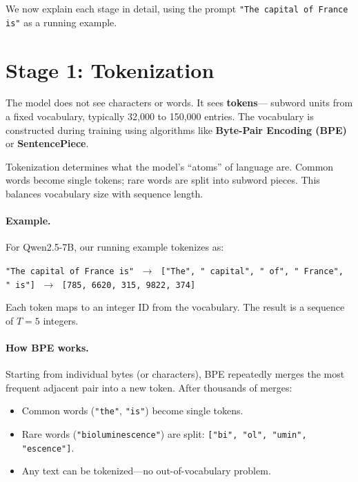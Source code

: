 \documentclass[11pt, twoside, openright]{memoir}
\begin{document}
We now explain each stage in detail, using the prompt
\texttt{"The capital of France is"} as a running example.

\section{Stage 1: Tokenization}

The model does not see characters or words.  It sees \textbf{tokens}---
subword units from a fixed vocabulary, typically 32,000 to 150,000 entries.
The vocabulary is constructed during training using algorithms like
\textbf{Byte-Pair Encoding (BPE)} or \textbf{SentencePiece}.

\begin{keyidea}
Tokenization determines what the model's ``atoms'' of language are.  Common
words become single tokens; rare words are split into subword pieces.  This
balances vocabulary size with sequence length.
\end{keyidea}

\paragraph{Example.} For Qwen2.5-7B, our running example tokenizes as:

\begin{center}\small
\texttt{"The capital of France is"} $\;\to\;$
\texttt{["The", " capital", " of", " France", " is"]}
$\;\to\;$ \texttt{[785, 6620, 315, 9822, 374]}
\end{center}

Each token maps to an integer ID from the vocabulary.  The result is a
sequence of $T = 5$ integers.

\paragraph{How BPE works.} Starting from individual bytes (or characters),
BPE repeatedly merges the most frequent adjacent pair into a new token.
After thousands of merges:
\begin{itemize}[nosep]
\item Common words (\texttt{"the"}, \texttt{"is"}) become single tokens.
\item Rare words (\texttt{"bioluminescence"}) are split:
  \texttt{["bi", "ol", "umin", "escence"]}.
\item Any text can be tokenized---no out-of-vocabulary problem.
\end{itemize}
\end{document}
